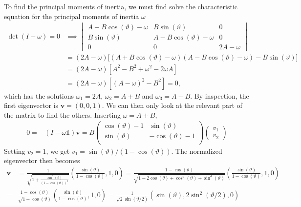 \documentclass{article}
\begin{document}
        To find the principal moments of inertia, we must find solve the characteristic equation for the principal moments of inertia $\omega$
        \begin{align*}
             \det(I - \omega) = 0& \implies
            \begin{vmatrix*}
                A + B\cos(\vartheta) - \omega & B \sin(\vartheta) & 0 \\
                B \sin(\vartheta) & A - B\cos(\vartheta) - \omega & 0 \\
                0 & 0 & 2A - \omega
            \end{vmatrix*} \\
            &= (2A - \omega) \big[(A + B\cos(\vartheta) - \omega) (A - B\cos(\vartheta) - \omega)  - B \sin(\vartheta) \big]  \\
            &= (2A - \omega)[A^2 - B^2 + \omega^2 - 2\omega A] \\
            &= (2A - \omega)[(A - \omega)^2 - B^2] = 0,
        \end{align*}
        which has the solutions $\omega_1 = 2A, \, \omega_2 = A+B$ and $\omega_3 = A-B$. By inspection, the first eigenvector is $\mathbf{v} = (0, 0, 1)$. We can then only look at the relevant part of the matrix to find the others. Inserting $\omega = A + B $,
        \begin{align*}
            0 = & (I - \omega \mathbb{1}) \mathbf{v} = B
            \begin{pmatrix*}
                \cos(\vartheta) - 1 & \sin(\vartheta)  \\
                \sin(\vartheta) & -\cos(\vartheta)-1  \\
            \end{pmatrix*} 
            \begin{pmatrix*}
                v_1 \\
                v_2 
            \end{pmatrix*}
        \end{align*}
        Setting $v_2 = 1$, we get $v_1 = \sin(\vartheta) / (1 - \cos(\vartheta))$. The normalized eigenvector then becomes
        \begin{align*}
            \mathbf{v} &= \frac{1}{\sqrt{1 + \frac{\sin^2(\vartheta)}{(1 - \cos(\vartheta))^2}}} \left( \frac{\sin(\vartheta)}{1 - \cos(\vartheta)}, 1, 0 \right)
            = \frac{1 - \cos(\vartheta)}{\sqrt{1 - 2 \cos(\theta) + \cos^2(\vartheta)  + \sin^2(\vartheta)}}\left( \frac{\sin(\vartheta)}{1 - \cos(\vartheta)}, 1, 0 \right) \\
            = &\frac{1 - \cos(\vartheta)}{\sqrt{1 - \cos(\vartheta) } }\left( \frac{\sin(\vartheta)}{1 - \cos(\vartheta)}, 1, 0 \right) 
            = \frac{1}{\sqrt 2 \sin(\vartheta/2) }\left( \sin(\vartheta), 2\sin^2(\vartheta / 2), 0 \right) 
        \end{align*}
\end{document}
